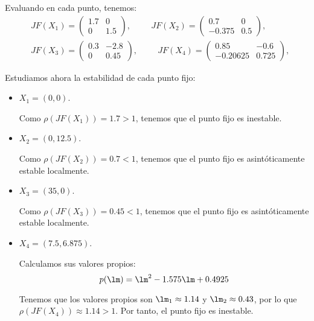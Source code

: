 \begin{ejercicio}
\begin{enumerate}
    Evaluando en cada punto, tenemos:
    \begin{align*}
        &JF(X_1) = \begin{pmatrix}
            1.7 & 0\\
            0 & 1.5
        \end{pmatrix},\hspace{1cm}
        JF(X_2) = \begin{pmatrix}
            0.7 & 0\\
            -0.375 & 0.5
        \end{pmatrix},\\
        &JF(X_3) = \begin{pmatrix}
            0.3 & -2.8\\
            0 & 0.45
        \end{pmatrix},\hspace{1cm}
        JF(X_4) = \begin{pmatrix}
            0.85 & -0.6\\
            -0.20625 & 0.725
        \end{pmatrix},
    \end{align*}

    Estudiamos ahora la estabilidad de cada punto fijo:
    \begin{itemize}
        \item $X_1=(0,0)$.
        
        Como $\rho(JF(X_1)) = 1.7>1$, tenemos que el punto fijo es inestable.

        \item $X_2=(0,12.5)$.
        
        Como $\rho(JF(X_2)) = 0.7<1$, tenemos que el punto fijo es asintóticamente estable localmente.

        \item $X_3=(35,0)$.
        
        Como $\rho(JF(X_3)) = 0.45<1$, tenemos que el punto fijo es asintóticamente estable localmente.

        \item $X_4=(7.5,6.875)$.
        
        Calculamos sus valores propios:
        \begin{equation*}
            p(\lm) = \lm^2-1.575\lm +0.4925
        \end{equation*}

        Tenemos que los valores propios son $\lm_1\approx 1.14$ y $\lm_2\approx 0.43$,
        por lo que $\rho(JF(X_4)) \approx 1.14>1$. Por tanto, el punto fijo es inestable.
    \end{itemize}


\end{enumerate}
\end{ejercicio}
